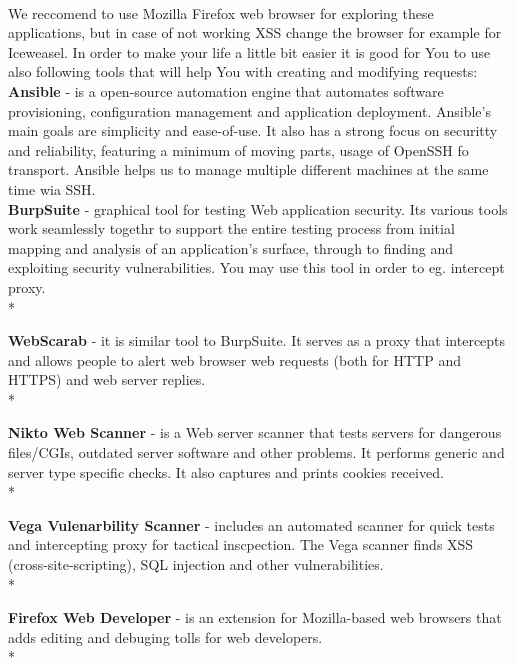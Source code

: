 \documentclass[12pt, a4paper]{article}
\begin{document}
\paragraph{}We reccomend to use Mozilla Firefox web browser for exploring these applications, but in case of not working XSS change the browser for example for Iceweasel. In order to make your life a little bit easier it is good for You to use also following tools that will help You with creating and modifying requests:\\

\textbullet{} \textbf{Ansible} - is a open-source automation engine that automates software provisioning, configuration management and application deployment. Ansible's main goals are simplicity and ease-of-use. It also has a strong focus on securitty and reliability, featuring a minimum of moving parts, usage of OpenSSH fo transport. Ansible helps us to manage multiple different machines at the same time wia SSH.\\

\textbullet{} \textbf{BurpSuite} - graphical tool for testing Web application security. Its various tools work seamlessly togethr to support the entire testing process from initial mapping and analysis of an application's surface, through to finding and exploiting security vulnerabilities. You may use this tool in order to eg. intercept proxy.\\*

\textbullet{} \textbf{WebScarab} - it is similar tool to BurpSuite. It serves as a proxy that intercepts and allows people to alert web browser web requests (both for HTTP and HTTPS) and web server replies.\\*

\textbullet{} \textbf{Nikto Web Scanner} - is a Web server scanner that tests servers for dangerous files/CGIs, outdated server software and other problems. It performs generic and server type specific checks. It also captures and prints cookies received.\\*

\textbullet{} \textbf{Vega Vulenarbility Scanner} - includes an automated scanner for quick tests and intercepting proxy for tactical inscpection. The Vega scanner finds XSS (cross-site-scripting), SQL injection and other vulnerabilities. \\*

\textbullet{} \textbf{Firefox Web Developer} - is an extension for Mozilla-based web browsers that adds editing and debuging tolls for web developers.\\*
\end{document}
